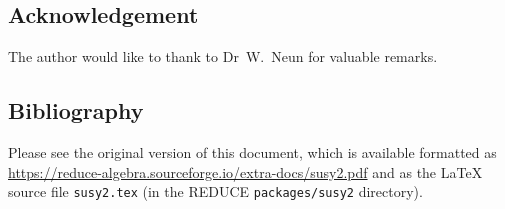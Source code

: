 \subsection*{Acknowledgement}

The author would like to thank to Dr~W.~Neun for valuable remarks.

\subsection*{Bibliography}
\label{susy2-bib}

Please see the original version of this document, which is available
formatted as
\url{https://reduce-algebra.sourceforge.io/extra-docs/susy2.pdf} and
as the \LaTeX{} source file \texttt{susy2.tex} (in the REDUCE
\texttt{packages/susy2} directory).
